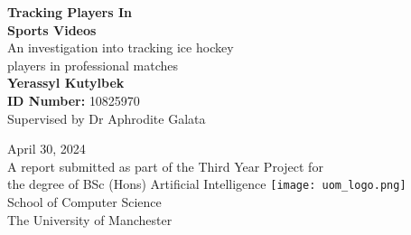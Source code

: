 \documentclass[12pt, letterpaper]{article}
\begin{document}
\begin{center}
    \Huge\textbf{Tracking Players In \\ Sports Videos} \\[12pt]
    \Large{An investigation into tracking ice hockey \\ players in professional matches} \\[55pt]
    \huge\textbf{Yerassyl Kutylbek} \\[6pt]
    \Large\textbf{ID Number:} {10825970} \\[5pt]
    \Large{Supervised by Dr Aphrodite Galata} \\[5pt]
    \date\Large{April 30, 2024} \\[90pt]

    \large{A report submitted as part of the Third Year Project for} \\[3pt]
    \large{the degree of BSc (Hons) Artificial Intelligence}
    \centering
    \texttt{[image: uom\_logo.png]} \\
    \large{School of Computer Science} \\[5pt]
    \large{The University of Manchester}
\end{center}

\tableofcontents
\newpage

\listoftables
\newpage

\hypertarget{listoffigures}{}
\listoffigures
\newpage

\end{document}
